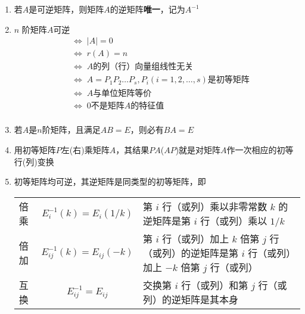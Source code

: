 \documentclass[a4paper,12pt]{article}
\begin{document}
    \begin{enumerate}
        \item 若$A$是可逆矩阵，则矩阵$A$的逆矩阵\textbf{唯一}，记为$A^{-1}$
        \item $n$ 阶矩阵$A$可逆
        \begin{align*}
            &\Leftrightarrow\; |A| = 0  \\
            &\Leftrightarrow\; r(A) = n  \\
            &\Leftrightarrow\; A \text{的列（行）向量组线性无关}  \\
            &\Leftrightarrow\; A = P_{1}P_{2}\dots P_{s}, P_{i}(i = 1,2,\dots,s)\text{是初等矩阵}  \\
            &\Leftrightarrow\; A \text{与单位矩阵等价}  \\
            &\Leftrightarrow\; 0\text{不是矩阵} A \text{的特征值}  \\
        \end{align*}
        \item 若$A$是$n$阶矩阵，且满足$AB = E$，则必有$BA = E$
        \item 用初等矩阵$P$左(右)乘矩阵$A$，其结果$PA$($AP$)就是对矩阵$A$作一次相应的初等行(列)变换
        \item 初等矩阵均可逆，其逆矩阵是同类型的初等矩阵，即

        \renewcommand{\arraystretch}{1.2}  %
        \begin{tabularx}{\textwidth}{l c >{\raggedright\arraybackslash}X}
            倍乘 & $E_i^{-1}(k) = E_i(1/k)$      & 第 $i$ 行（或列）乘以非零常数 $k$ 的逆矩阵是第 $i$ 行（或列）乘以 $1/k$                     \\
            倍加 & $E_{ij}^{-1}(k) = E_{ij}(-k)$ & 第 $i$ 行（或列）加上 $k$ 倍第 $j$ 行（或列）的逆矩阵是第 $i$ 行（或列）加上 $-k$ 倍第 $j$ 行（或列） \\
            互换 & $E_{ij}^{-1} = E_{ij}$        & 交换第 $i$ 行（或列）和第 $j$ 行（或列）的逆矩阵是其本身                                  \\
        \end{tabularx}
    \end{enumerate}
\end{document}
